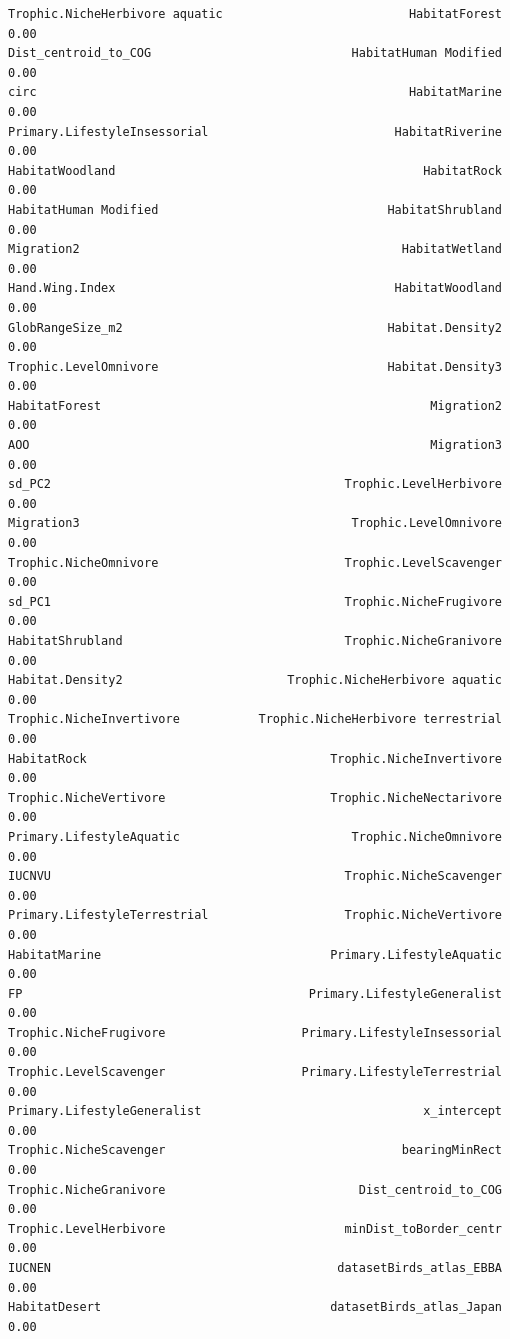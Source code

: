 \documentclass[
  letterpaper,
  DIV=11,
  numbers=noendperiod]{scrreprt}
\begin{document}
\begin{verbatim}
Trophic.NicheHerbivore aquatic                          HabitatForest    0.00
Dist_centroid_to_COG                            HabitatHuman Modified    0.00
circ                                                    HabitatMarine    0.00
Primary.LifestyleInsessorial                          HabitatRiverine    0.00
HabitatWoodland                                           HabitatRock    0.00
HabitatHuman Modified                                HabitatShrubland    0.00
Migration2                                             HabitatWetland    0.00
Hand.Wing.Index                                       HabitatWoodland    0.00
GlobRangeSize_m2                                     Habitat.Density2    0.00
Trophic.LevelOmnivore                                Habitat.Density3    0.00
HabitatForest                                              Migration2    0.00
AOO                                                        Migration3    0.00
sd_PC2                                         Trophic.LevelHerbivore    0.00
Migration3                                      Trophic.LevelOmnivore    0.00
Trophic.NicheOmnivore                          Trophic.LevelScavenger    0.00
sd_PC1                                         Trophic.NicheFrugivore    0.00
HabitatShrubland                               Trophic.NicheGranivore    0.00
Habitat.Density2                       Trophic.NicheHerbivore aquatic    0.00
Trophic.NicheInvertivore           Trophic.NicheHerbivore terrestrial    0.00
HabitatRock                                  Trophic.NicheInvertivore    0.00
Trophic.NicheVertivore                       Trophic.NicheNectarivore    0.00
Primary.LifestyleAquatic                        Trophic.NicheOmnivore    0.00
IUCNVU                                         Trophic.NicheScavenger    0.00
Primary.LifestyleTerrestrial                   Trophic.NicheVertivore    0.00
HabitatMarine                                Primary.LifestyleAquatic    0.00
FP                                        Primary.LifestyleGeneralist    0.00
Trophic.NicheFrugivore                   Primary.LifestyleInsessorial    0.00
Trophic.LevelScavenger                   Primary.LifestyleTerrestrial    0.00
Primary.LifestyleGeneralist                               x_intercept    0.00
Trophic.NicheScavenger                                 bearingMinRect    0.00
Trophic.NicheGranivore                           Dist_centroid_to_COG    0.00
Trophic.LevelHerbivore                         minDist_toBorder_centr    0.00
IUCNEN                                        datasetBirds_atlas_EBBA    0.00
HabitatDesert                                datasetBirds_atlas_Japan    0.00

\end{verbatim}
\end{document}
